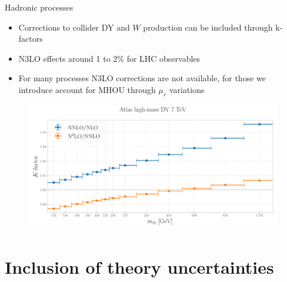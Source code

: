 \documentclass[aspectratio=169, 9pt,t]{beamer}
\begin{document}
\begin{frame}{Hadronic processes}
  \begin{itemize}
    \item Corrections to collider DY and $W$ production can be included through k-factors
    \item N3LO effects around 1 to 2\% for LHC observables
    \item For many processes N3LO corrections are not available, for those we introduce account for MHOU through $\mu_r$ variations
  \end{itemize}
  \begin{figure}[!t]
    \centering
    \includegraphics[width=.80\textwidth]{figures/kfactor_ATLASZHIGHMASS49FB.pdf}
  \end{figure}
\end{frame}


\section{Inclusion of theory uncertainties}
\end{document}
